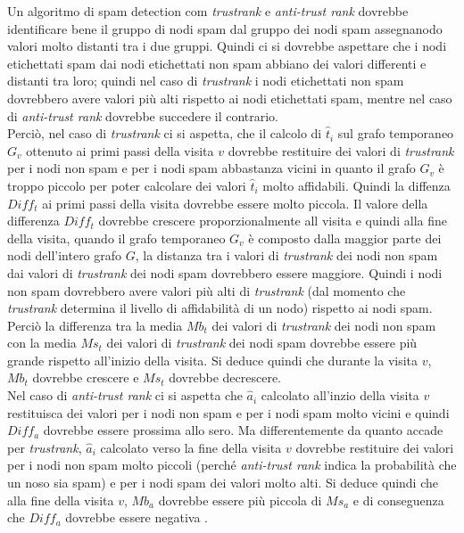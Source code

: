 Un algoritmo di spam detection com \textit{trustrank} e \textit{anti-trust rank} dovrebbe identificare bene il gruppo di nodi spam dal gruppo dei nodi spam assegnanodo valori molto distanti tra i due gruppi. Quindi ci si dovrebbe aspettare che i nodi etichettati spam dai nodi etichettati non spam abbiano dei valori differenti e distanti tra loro; quindi nel caso di \textit{trustrank} i nodi etichettati non spam dovrebbero avere valori più alti rispetto ai nodi etichettati spam, mentre nel caso di  \textit{anti-trust rank} dovrebbe succedere il contrario.\\
Perciò, nel caso di \textit{trustrank} ci si aspetta, che  il calcolo di \(\hat{t}_i\) sul grafo temporaneo \(G_v\) ottenuto ai primi passi della visita \(v\) dovrebbe restituire dei valori di \textit{trustrank} per i nodi non spam e per i nodi spam abbastanza vicini in quanto il grafo \(G_v\) è troppo piccolo per poter calcolare dei valori \(\hat{t}_i\) molto affidabili. Quindi la diffenza \(Diff_t\) ai primi passi della visita dovrebbe essere molto piccola. Il valore della differenza \(Diff_t\) dovrebbe crescere proporzionalmente all visita e quindi alla fine della visita, quando il grafo temporaneo \(G_v\) è composto dalla maggior parte dei nodi dell'intero grafo \(G\), la distanza tra i valori di \textit{trustrank} dei nodi non spam dai valori di \textit{trustrank} dei nodi spam dovrebbero essere maggiore. Quindi i nodi non spam dovrebbero avere valori più alti di \textit{trustrank} (dal momento che \textit{trustrank} determina il livello di affidabilità di un nodo) rispetto ai nodi spam. Perciò la differenza tra la media \(Mb_t\) dei valori di \textit{trustrank} dei nodi non spam con la media \(Ms_t\) dei valori di \textit{trustrank} dei nodi spam dovrebbe essere più grande rispetto all'inizio della visita. Si deduce quindi che durante la visita \(v\), \(Mb_t\) dovrebbe crescere e \(Ms_t\) dovrebbe decrescere.\\
Nel caso di \textit{anti-trust rank} ci si aspetta  che \(\hat{a}_i\) calcolato all'inzio della visita \(v\) restituisca dei valori per i nodi non spam e per i nodi spam molto vicini e quindi \(Diff_a\) dovrebbe  essere prossima allo sero. Ma differentemente da quanto accade per \textit{trustrank}, \(\hat{a}_i\) calcolato verso la fine della visita \(v\) dovrebbe restituire dei valori per i nodi non spam molto piccoli (perché \textit{anti-trust rank} indica la probabilità  che un noso sia spam) e per i nodi spam dei valori molto alti. Si deduce quindi che alla fine della visita \(v\),  \(Mb_a\) dovrebbe essere più piccola di \(Ms_a\) e di conseguenza che \(Diff_a\) dovrebbe essere negativa . 

